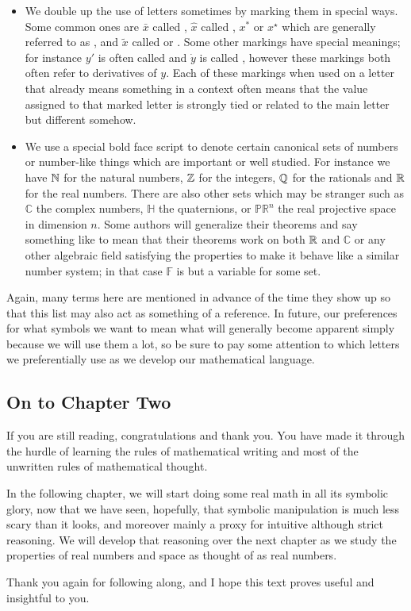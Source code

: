 \documentclass[11pt]{article}
\begin{document}
\begin{itemize}
\item We double up the use of letters sometimes by marking them in special ways. Some common ones are $\bar{x}$ called , $\hat{x}$ called , $x^*$ or $x^\star$ which are generally referred to as , and $\tilde{x}$ called  or . Some other markings have special meanings; for instance $y'$ is often called  and $\dot{y}$ is called , however these markings both often refer to derivatives of $y$. Each of these markings when used on a letter that already means something in a context often means that the value assigned to that marked letter is strongly tied or related to the main letter but different somehow.

\item We use a special bold face script to denote certain canonical sets of numbers or number-like things which are important or well studied. For instance we have $\mathbb{N}$ for the natural numbers, $\mathbb{Z}$ for the integers, $\mathbb{Q}$ for the rationals and $\mathbb{R}$ for the real numbers. There are also other sets which may be stranger such as $\mathbb{C}$ the complex numbers, $\mathbb{H}$ the quaternions, or $\mathbb{PR}^n$ the real projective space in dimension $n$. Some authors will generalize their theorems and say something like  to mean that their theorems work on both $\mathbb{R}$ and $\mathbb{C}$ or any other algebraic field satisfying the properties to make it behave like a similar number system; in that case $\mathbb{F}$ is but a variable for some set.
\end{itemize}

Again, many terms here are mentioned in advance of the time they show up so that this list may also act as something of a reference. In future, our preferences for what symbols we want to mean what will generally become apparent simply because we will use them a lot, so be sure to pay some attention to which letters we preferentially use as we develop our mathematical language.

\subsection{On to Chapter Two}

If you are still reading, congratulations and thank you. You have made it through the hurdle of learning the rules of mathematical writing and most of the unwritten rules of mathematical thought. 

In the following chapter, we will start doing some real math in all its symbolic glory, now that we have seen, hopefully, that symbolic manipulation is much less scary than it looks, and moreover mainly a proxy for intuitive although strict reasoning. We will develop that reasoning over the next chapter as we study the properties of real numbers and space as thought of as real numbers.

Thank you again for following along, and I hope this text proves useful and insightful to you.
\end{document}
